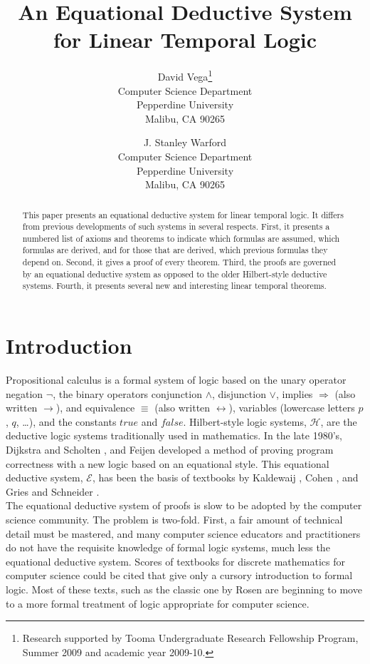 \documentclass[fleqn, leqno]{article}
\title{An Equational Deductive System\\for Linear Temporal Logic}
\author{David Vega\thanks{Research supported by Tooma Undergraduate Research Fellowship Program, Summer 2009
        and academic year 2009-10.}\\
   Computer Science Department\\
   Pepperdine University\\
   Malibu, CA 90265
   \and
   J. Stanley Warford\\
   Computer Science Department\\
   Pepperdine University\\
   Malibu, CA 90265}
\date{} %
\newcommand{\impl}{\ensuremath{\Rightarrow}}        %
\begin{document}
\maketitle
\begin{abstract}
This paper presents an equational deductive system for linear temporal logic.
It differs from previous developments of such systems in several respects.
First, it presents a numbered list of axioms and theorems to indicate which formulas are assumed, which formulas are
derived, and for those that are derived, which previous formulas they depend on.
Second, it gives a proof of every theorem.
Third, the proofs are governed by an equational deductive system as opposed to the older Hilbert-style deductive systems.
Fourth, it presents several new and interesting linear temporal theorems.\end{abstract}

\thispagestyle{plain}

\section{Introduction}

Propositional calculus is a formal system of logic based on the unary operator negation $\lnot$,
the binary operators conjunction $\land$, disjunction $\lor$, implies $\impl$ (also written $\rightarrow$),
and equivalence $\equiv$ (also written $\leftrightarrow$),
variables (lowercase letters $p$, $q$, \dots), and the constants $true$ and $false$.
Hilbert-style logic systems, $\mathcal{H}$, are the deductive logic systems traditionally used in mathematics.
In the late 1980's, Dijkstra and Scholten \cite{DandS}, and Feijen \cite{Feij} developed a method of proving
program correctness with a new logic based on an equational style.
This equational deductive system, $\mathcal{E}$, has been the basis of textbooks by Kaldewaij \cite{Kald},
Cohen \cite{Cohen}, and Gries and Schneider \cite{LADM}.\\

The equational deductive system of proofs is slow to be adopted by the computer science community.
The problem is two-fold.
First, a fair amount of technical detail must be mastered,
and many computer science educators and practitioners do not have the requisite
knowledge of formal logic systems, much less the equational deductive system.
Scores of textbooks for discrete mathematics for computer science could be cited that give only a cursory introduction to
formal logic. Most of these texts, such as the classic one by Rosen \cite{Rosen} are beginning to move to a more
formal treatment of logic appropriate for computer science.\\
\end{document}
